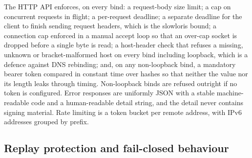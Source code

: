 \documentclass{article}
\begin{document}
The HTTP API enforces, on every bind: a request-body size limit; a cap on
concurrent requests in flight; a per-request deadline; a separate deadline for
the client to finish sending request headers, which is the slowloris bound; a
connection cap enforced in a manual accept loop so that an over-cap socket is
dropped before a single byte is read; a host-header check that refuses a
missing, unknown or bracket-malformed host on every bind including loopback,
which is a defence against DNS rebinding; and, on any non-loopback bind, a
mandatory bearer token compared in constant time over hashes so that neither
the value nor its length leaks through timing. Non-loopback binds are refused
outright if no token is configured. Error responses are uniformly JSON with a
stable machine-readable code and a human-readable detail string, and the detail
never contains signing material. Rate limiting is a token bucket per remote
address, with IPv6 addresses grouped by prefix.

\subsection{Replay protection and fail-closed behaviour}
\end{document}
